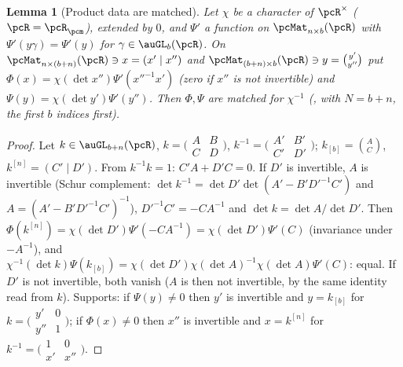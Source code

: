 \documentclass[10pt]{amsart}
\newtheorem{lemma}[theorem]{Lemma}
\theoremstyle{definition}
\theoremstyle{remark}
\newcommand{\C}{\mathbb C}
\begin{document}
\begin{lemma}[Product data are matched]\label{pte:matched}
Let $\chi$ be a character of $\pcR^\times$ ($\pcR=\pcR_\pcm$), extended by $0$, and $\Psi'$ a function on
$\pcMat_{n\times b}(\pcR)$ with $\Psi'(y\gamma)=\Psi'(y)$ for $\gamma\in\auGL_b(\pcR)$. On
$\pcMat_{n\times(b+n)}(\pcR)\ni x=(x'\mid x'')$ and $\pcMat_{(b+n)\times b}(\pcR)\ni y=\binom{y'}{y''}$
put $\Phi(x)=\chi(\det x'')\Psi'(x''^{-1}x')$ (zero if $x''$ is not invertible) and $\Psi(y)=
\chi(\det y')\Psi'(y'')$. Then $\Phi,\Psi$ are matched for $\chi^{-1}$ ({\cite[Definition~3.1]{P53}},
with $N=b+n$, the first $b$ indices first).
\end{lemma}
\begin{proof}
Let $k\in\auGL_{b+n}(\pcR)$, $k=\bigl(\begin{smallmatrix}A&B\\C&D\end{smallmatrix}\bigr)$, $k^{-1}=
\bigl(\begin{smallmatrix}A'&B'\\C'&D'\end{smallmatrix}\bigr)$; $k_{[b]}=\binom AC$, $k^{[n]}=(C'\mid
D')$. From $k^{-1}k=1$: $C'A+D'C=0$. If $D'$ is invertible, $A$ is invertible (Schur complement:
$\det k^{-1}=\det D'\det(A'-B'D'^{-1}C')$ and $A=(A'-B'D'^{-1}C')^{-1}$), $D'^{-1}C'=-CA^{-1}$ and
$\det k=\det A/\det D'$. Then $\Phi(k^{[n]})=\chi(\det D')\Psi'(-CA^{-1})=\chi(\det D')\Psi'(C)$ (invariance
under $-A^{-1}$), and $\chi^{-1}(\det k)\Psi(k_{[b]})=\chi(\det D')\chi(\det A)^{-1}\chi(\det A)\Psi'(C)$:
equal. If $D'$ is not invertible, both vanish ($A$ is then not invertible, by the same identity read
from $k$). Supports: if $\Psi(y)\ne0$ then $y'$ is invertible and $y=k_{[b]}$ for $k=\bigl(\begin{smallmatrix}
y'&0\\y''&1\end{smallmatrix}\bigr)$; if $\Phi(x)\ne0$ then $x''$ is invertible and $x=k^{[n]}$ for
$k^{-1}=\bigl(\begin{smallmatrix}1&0\\x'&x''\end{smallmatrix}\bigr)$.
\end{proof}
\end{document}
